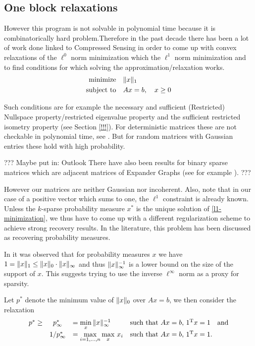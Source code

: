 \documentclass{article} %
\begin{document}
\subsection{One block relaxations}
\label{Relaxations}

However this program is not solvable in polynomial time because it is combinatorically hard problem.Therefore in the past decade there has been a lot of work done linked to Compressed Sensing in order to come up with convex relaxations of the $\ell^0$ norm minimization which the $\ell^1$ norm minimization and to find conditions for which solving the approximation/relaxation works.
\begin{equation}\label{l1-minimization}
  \begin{split}
    \text{minimize} &\quad \lVert x\rVert_1\\
    \text{subject to} &\quad Ax = b,\quad x\geq 0
  \end{split}
\end{equation}

Such conditions are for example the necessary and sufficient (Restricted) Nullspace property/restricted eigenvalue property and the sufficient restricted isometry property (see Section \ref{!!!}).
For deterministic matrices these are not checkable in polynomial time, see \cite{DonohoCheckable}. But for random matrices with Gaussian entries these hold with high probability. 

??? Maybe put in: Outlook There have also been results for binary sparse matrices which are adjacent matrices of Expander Graphs (see for example \cite{Indyk_Unified}). ???

However our matrices are neither Gaussian nor incoherent. Also, note that in our case of a positive vector which sums to one, the $\ell^1$ constraint is already known. Unless the $k$-sparse probability measure $x^*$ is the unique solution of \eqref{l1-minimization}, we thus have to come up with a different regularization scheme to achieve strong recovery results. In the literature, this problem has been discussed as recovering probability measures. 

In \cite{mert} it was observed that for probability measures $x$ we have $1 = \lVert x\rVert_1 \leq \lVert x\rVert_0\cdot \lVert x\rVert_\infty$ and thus $\lVert x\rVert_{\infty}^{-1}$ is a lower bound on the size of the support of $x$. This suggests trying to use the inverse $\ell^\infty$ norm as a proxy for sparsity.

Let $p^*$ denote the minimum value of $\lVert x\rVert_0$ over $Ax = b$, we then consider the relaxation
\begin{equation}\label{l8-recovery}
  \begin{array}{rcllllr}
  p^* \geq& p_\infty^* &= \min\limits_x\, \lVert x\rVert_\infty^{-1}&\text{such that $Ax = b$, $1^{\rm T} x = 1$}\quad \text{and}\\[5pt]
  &1/p_\infty^* &= \max\limits_{i=1,\dots,n} \max\limits_{x}\,x_i&\text{such that $Ax = b$, $1^{\rm T} x = 1$.}
  \end{array}
\end{equation}
\end{document}
